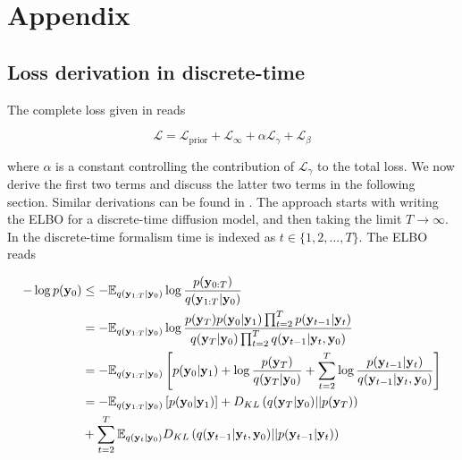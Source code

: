 \section{Appendix}

\subsection{Loss derivation in discrete-time}

The complete loss given in \parencite{Maggiora2023} reads

\begin{equation}
\mathcal{L} = \mathcal{L}_{\mathrm{prior}} + \mathcal{L}_{\infty} + \alpha\mathcal{L}_{\gamma} + \mathcal{L}_{\beta}
\end{equation}

where $\alpha$ is a constant controlling the contribution of $\mathcal{L}_{\gamma}$ to the total loss. We now derive the first two terms and discuss the latter two terms in the following section. Similar derivations can be found in \parencite{Maggiora2023,Kingma2021,Ribeiro2024}. The approach starts with writing the ELBO for a discrete-time diffusion model, and then taking the limit $T\rightarrow \infty$. In the discrete-time formalism time is indexed as $t\in \{1,2,...,T\}$. The ELBO reads

\begin{align*}
-\log p(\bold{y}_{0}) &\leq - \mathbb{E}_{q(\bold{y}_{1:T}\lvert\bold{y}_{0})} \log \frac{p(\bold{y}_{0:T})}{q(\bold{y}_{1:T}\lvert\bold{y}_{0})}\\
&= -\mathbb{E}_{q(\bold{y}_{1:T}\lvert\bold{y}_{0})} \log \frac{p(\bold{y}_{T})p(\bold{y}_0\lvert\bold{y}_1) \prod_{t=2}^{T}p(\bold{y}_{t-1}\lvert\bold{y}_t)}{q(\bold{y}_T\lvert\bold{y}_0)\prod_{t=2}^{T}q(\bold{y}_{t-1}\lvert\bold{y}_t,\bold{y}_0)}\\
&= -\mathbb{E}_{q(\bold{y}_{1:T}\lvert\bold{y}_{0})} \left[ p(\bold{y}_0\lvert\bold{y}_1) + \log \frac{p(\bold{y}_{T})}{q(\bold{y}_T\lvert\bold{y}_0)} + \sum_{t=2}^{T} \log \frac{p(\bold{y}_{t-1}\lvert\bold{y}_t)}{q(\bold{y}_{t-1}\lvert\bold{y}_t,\bold{y}_0)}\right]\\
&= -\mathbb{E}_{q(\bold{y}_{1:T}\lvert\bold{y}_{0})} \left[ p(\bold{y}_0\lvert\bold{y}_1)\right] + D_{KL}\left(q(\bold{y}_T\lvert\bold{y}_0) \lvert\lvert p(\bold{y}_{T})\right) \\
&+ \sum_{t=2}^{T} \mathbb{E}_{q(\bold{y}_{t}\lvert\bold{y}_{0})} D_{KL}\left(q(\bold{y}_{t-1}\lvert\bold{y}_t,\bold{y}_0)\lvert\lvert p(\bold{y}_{t-1}\lvert\bold{y}_t) \right)
\end{align*}

